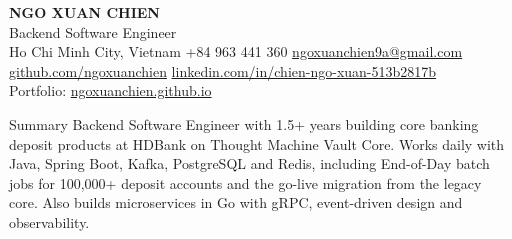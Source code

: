 \documentclass{resume} %
\begin{document}
\raggedright %


\noindent
{\LARGE\bf NGO XUAN CHIEN} \\[6pt]
{\large Backend Software Engineer} \\[4pt]
Ho Chi Minh City, Vietnam \textbar{} +84 963 441 360 \textbar{} \href{mailto:ngoxuanchien9a@gmail.com}{ngoxuanchien9a@gmail.com} \\
\href{https://github.com/ngoxuanchien}{github.com/ngoxuanchien} \textbar{} \href{https://www.linkedin.com/in/chien-ngo-xuan-513b2817b/}{linkedin.com/in/chien-ngo-xuan-513b2817b} \\
Portfolio: \href{https://ngoxuanchien.github.io}{ngoxuanchien.github.io}


\begin{rSection}{Summary}
    Backend Software Engineer with 1.5+ years building core banking deposit products at HDBank on Thought Machine Vault Core. Works daily with Java, Spring Boot, Kafka, PostgreSQL and Redis, including End-of-Day batch jobs for 100,000+ deposit accounts and the go-live migration from the legacy core. Also builds microservices in Go with gRPC, event-driven design and observability.
\end{rSection}
\end{document}
